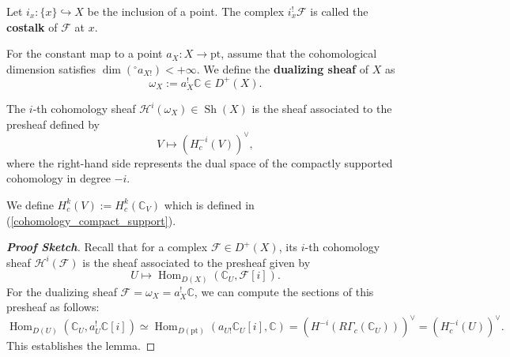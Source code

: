 \begin{definition}
Let $i_x \colon \{x\} \hookrightarrow X$ be the inclusion of a point. The complex $i_x^! \mathcal{F}$ is called the \textbf{costalk} of $\mathcal{F}$ at $x$.
\end{definition}

\begin{definition}
For the constant map to a point $a_X \colon X \longrightarrow \text{pt}$, assume that the cohomological dimension satisfies $\dim(^\circ a_{X!}) < +\infty$. 
We define the \textbf{dualizing sheaf} of $X$ as
\begin{equation*}
    \omega_X := a_X^! \mathbb{C} \in D^+(X).
\end{equation*}
\end{definition}

\begin{lemma}
The $i$-th cohomology sheaf $\mathcal{H}^i(\omega_X) \in \operatorname{Sh}(X)$ is the sheaf associated to the presheaf defined by
\begin{equation*}
    V \longmapsto (H^{-i}_c(V))^\vee,
\end{equation*}
where the right-hand side represents the dual space of the compactly supported cohomology in degree $-i$.
\end{lemma}

\begin{remark}
    We define $H^k_c(V):=H^k_c(\mathbb{C}_V)$ which is defined in (\ref{cohomology_compact_support}).
\end{remark}

\begin{proof}[\textbf{Proof Sketch}]
Recall that for a complex $\mathcal{F} \in D^+(X)$, its $i$-th cohomology sheaf $\mathcal{H}^i(\mathcal{F})$ is the sheaf associated to the presheaf given by
\begin{equation*}
    U \longmapsto \operatorname{Hom}_{D(X)}(\mathbb{C}_U, \mathcal{F}[i]).
\end{equation*}
For the dualizing sheaf $\mathcal{F} = \omega_X = a_X^! \mathbb{C}$, we can compute the sections of this presheaf as follows:
\begin{equation*}
    \operatorname{Hom}_{D(U)}(\mathbb{C}_U, a_U^! \mathbb{C}[i]) \simeq 
    \operatorname{Hom}_{D(\mathrm{pt})}(a_{U!} \mathbb{C}_U[i], \mathbb{C}) 
    = (H^{-i}(R\Gamma_c(\mathbb{C}_U)))^\vee = (H^{-i}_c(U))^\vee.
\end{equation*}
This establishes the lemma.
\end{proof}

